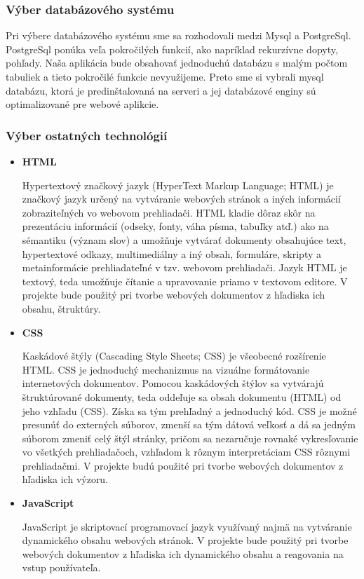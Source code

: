 \documentclass[12pt,a4paper]{article}
\begin{document}
\subsubsection{Výber databázového systému}
Pri výbere databázového systému sme sa rozhodovali medzi Mysql a PostgreSql. PostgreSql ponúka veľa pokročilých funkcií, ako napríklad rekurzívne dopyty, pohľady. Naša aplikácia bude obsahovať jednoduchú databázu s malým počtom tabuliek a tieto pokročilé funkcie nevyužijeme. Preto sme si vybrali mysql databázu, ktorá je predinštalovaná na serveri a jej databázové enginy sú optimalizované pre webové aplikcie.

\subsubsection{Výber ostatných technológií}
\begin{itemize}
	\item{\bf HTML} \par
	Hypertextový značkový jazyk (HyperText Markup Language; HTML) je značkový jazyk určený na vytváranie webových stránok a iných informácií zobraziteľných vo webovom prehliadači. HTML kladie dôraz skôr na prezentáciu informácií (odseky, fonty, váha písma, tabuľky atď.) ako na sémantiku (význam slov) a umožňuje vytvárať dokumenty obsahujúce text, hypertextové odkazy, multimediálny a iný obsah, formuláre, skripty a metainformácie prehliadateľné v tzv. webovom prehliadači. Jazyk HTML je textový, teda umožňuje čítanie a upravovanie priamo v textovom editore. V projekte bude použitý pri tvorbe webových dokumentov z hľadiska ich obsahu, štruktúry.
	\item{\bf CSS} \par
	Kaskádové štýly (Cascading Style Sheets; CSS) je všeobecné rozšírenie HTML. CSS je jednoduchý mechanizmus na vizuálne formátovanie internetových dokumentov. Pomocou kaskádových štýlov sa vytvárajú štruktúrované dokumenty, teda oddeľuje sa obsah dokumentu (HTML) od jeho vzhľadu (CSS). Získa sa tým prehľadný a jednoduchý kód. CSS je možné presunúť do externých súborov, zmenší sa tým dátová veľkosť a dá sa jedným súborom zmeniť celý štýl stránky, pričom sa nezaručuje rovnaké vykresľovanie vo všetkých prehliadačoch, vzhľadom k rôznym interpretáciam CSS rôznymi prehliadačmi. V projekte budú použité pri tvorbe webových dokumentov z hľadiska ich výzoru.
	\item{\bf JavaScript} \par
	JavaScript je skriptovací programovací jazyk využívaný najmä na vytváranie dynamického obsahu webových stránok. V projekte bude použitý pri tvorbe webových dokumentov z hľadiska ich dynamického obsahu a reagovania na vstup používateľa.

\end{itemize}
\end{document}

